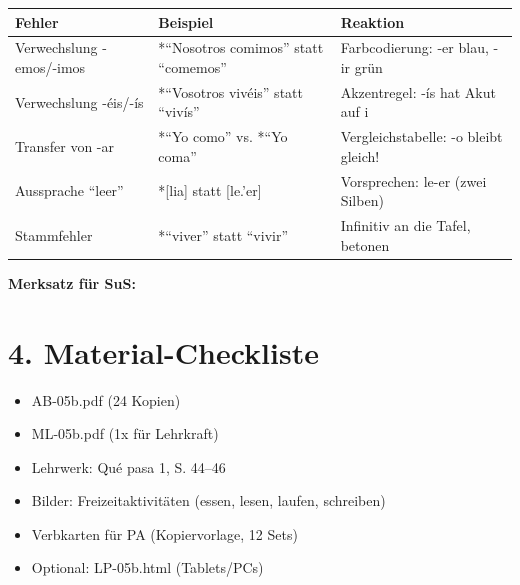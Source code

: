 \documentclass[11pt, a4paper]{article}
\begin{document}
\begin{fehlerbox}
\begin{tabularx}{\textwidth}{|l|X|X|}
\hline
\textbf{Fehler} & \textbf{Beispiel} & \textbf{Reaktion} \\
\hline
Verwechslung -emos/-imos & *``Nosotros comimos'' statt ``comemos'' & Farbcodierung: -er blau, -ir grün \\
\hline
Verwechslung -éis/-ís & *``Vosotros vivéis'' statt ``vivís'' & Akzentregel: -ís hat Akut auf i \\
\hline
Transfer von -ar & *``Yo como'' vs. *``Yo coma'' & Vergleichstabelle: -o bleibt gleich! \\
\hline
Aussprache ``leer'' & *[lia] statt [le.'er] & Vorsprechen: le-er (zwei Silben) \\
\hline
Stammfehler & *``viver'' statt ``vivir'' & Infinitiv an die Tafel, betonen \\
\hline
\end{tabularx}
\end{fehlerbox}

\vspace{1em}

\textbf{Merksatz für SuS:}

\begin{center}
\end{center}


\section*{4. Material-Checkliste}

\begin{materialbox}
\begin{itemize}[label=$\square$]
    \item AB-05b.pdf (24 Kopien)
    \item ML-05b.pdf (1x für Lehrkraft)
    \item Lehrwerk: Qué pasa 1, S. 44--46
    \item Bilder: Freizeitaktivitäten (essen, lesen, laufen, schreiben)
    \item Verbkarten für PA (Kopiervorlage, 12 Sets)
    \item Optional: LP-05b.html (Tablets/PCs)
\end{itemize}
\end{materialbox}
\end{document}
